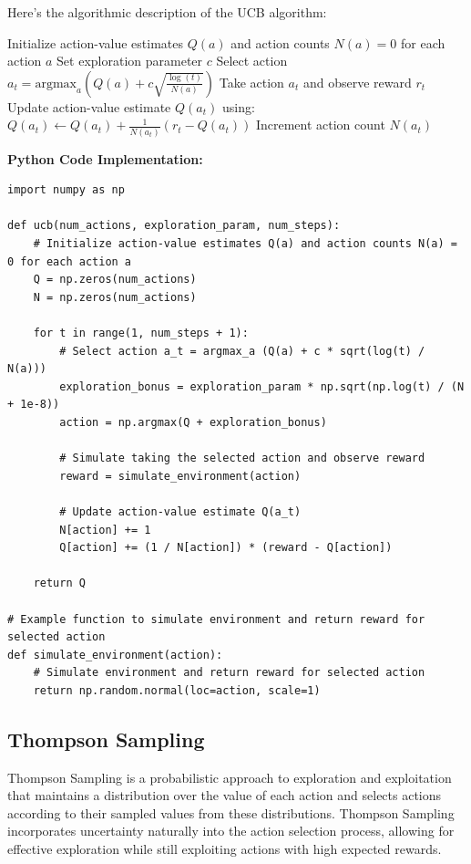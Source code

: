 \documentclass[12pt]{book} %
\begin{document}
Here's the algorithmic description of the UCB algorithm:
\FloatBarrier
\begin{algorithm}
\caption{Upper Confidence Bound (UCB) Algorithm}\label{alg:ucb}
\begin{algorithmic}[1]
\State Initialize action-value estimates \(Q(a)\) and action counts \(N(a) = 0\) for each action \(a\)
\State Set exploration parameter \(c\)
    \State Select action \(a_t = \text{argmax}_{a} \left( Q(a) + c \sqrt{\frac{\log(t)}{N(a)}} \right)\)
    \State Take action \(a_t\) and observe reward \(r_t\)
    \State Update action-value estimate \(Q(a_t)\) using:
    \State \quad \(Q(a_t) \leftarrow Q(a_t) + \frac{1}{N(a_t)}(r_t - Q(a_t))\)
    \State Increment action count \(N(a_t)\)
\EndFor
\end{algorithmic}
\end{algorithm}
\FloatBarrier
\textbf{Python Code Implementation:}
\FloatBarrier
\begin{lstlisting}
import numpy as np

def ucb(num_actions, exploration_param, num_steps):
    # Initialize action-value estimates Q(a) and action counts N(a) = 0 for each action a
    Q = np.zeros(num_actions)
    N = np.zeros(num_actions)

    for t in range(1, num_steps + 1):
        # Select action a_t = argmax_a (Q(a) + c * sqrt(log(t) / N(a)))
        exploration_bonus = exploration_param * np.sqrt(np.log(t) / (N + 1e-8))
        action = np.argmax(Q + exploration_bonus)

        # Simulate taking the selected action and observe reward
        reward = simulate_environment(action)

        # Update action-value estimate Q(a_t)
        N[action] += 1
        Q[action] += (1 / N[action]) * (reward - Q[action])

    return Q

# Example function to simulate environment and return reward for selected action
def simulate_environment(action):
    # Simulate environment and return reward for selected action
    return np.random.normal(loc=action, scale=1)
\end{lstlisting}
\subsection{Thompson Sampling}

Thompson Sampling is a probabilistic approach to exploration and exploitation that maintains a distribution over the value of each action and selects actions according to their sampled values from these distributions. Thompson Sampling incorporates uncertainty naturally into the action selection process, allowing for effective exploration while still exploiting actions with high expected rewards.
\end{document}
